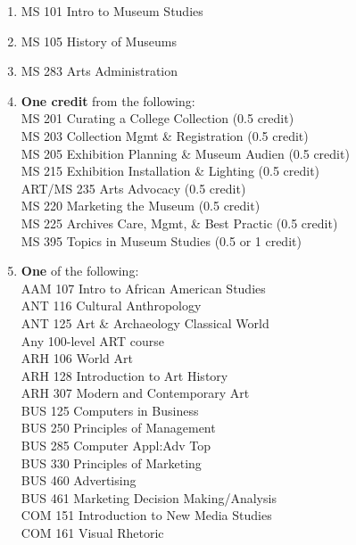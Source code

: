\documentclass[
  letterpaper,
]{scrbook}
\providecommand{\tightlist}{%
  \setlength{\itemsep}{0pt}\setlength{\parskip}{0pt}}
\begin{document}
\begin{enumerate}
\def\labelenumi{\arabic{enumi}.}
\tightlist
\item
  MS 101 Intro to Museum Studies\\
\item
  MS 105 History of Museums\\
\item
  MS 283 Arts Administration\\
\item
  \textbf{One credit} from the following:\\
  MS 201 Curating a College Collection (0.5 credit)\\
  MS 203 Collection Mgmt \& Registration (0.5 credit)\\
  MS 205 Exhibition Planning \& Museum Audien (0.5 credit)\\
  MS 215 Exhibition Installation \& Lighting (0.5 credit)\\
  ART/MS 235 Arts Advocacy (0.5 credit)\\
  MS 220 Marketing the Museum (0.5 credit)\\
  MS 225 Archives Care, Mgmt, \& Best Practic (0.5 credit)\\
  MS 395 Topics in Museum Studies (0.5 or 1 credit)\\
\item
  \textbf{One} of the following:\\
  AAM 107 Intro to African American Studies\\
  ANT 116 Cultural Anthropology\\
  ANT 125 Art \& Archaeology Classical World\\
  Any 100-level ART course\\
  ARH 106 World Art\\
  ARH 128 Introduction to Art History\\
  ARH 307 Modern and Contemporary Art\\
  BUS 125 Computers in Business\\
  BUS 250 Principles of Management\\
  BUS 285 Computer Appl:Adv Top\\
  BUS 330 Principles of Marketing\\
  BUS 460 Advertising\\
  BUS 461 Marketing Decision Making/Analysis\\
  COM 151 Introduction to New Media Studies\\
  COM 161 Visual Rhetoric\\

\end{enumerate}
\end{document}
